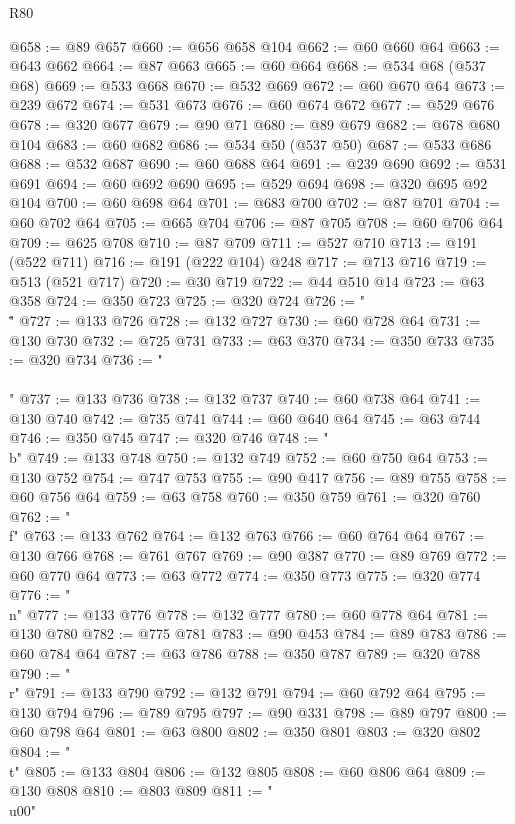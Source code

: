 \begin{lexlean}{R80}
\begin{coremodule}
@658 := @89 @657
@660 := @656 @658 @104
@662 := @60 @660 @64
@663 := @643 @662
@664 := @87 @663
@665 := @60 @664
@668 := @534 @68 (@537 @68)
@669 := @533 @668
@670 := @532 @669
@672 := @60 @670 @64
@673 := @239 @672
@674 := @531 @673
@676 := @60 @674 @672
@677 := @529 @676
@678 := @320 @677
@679 := @90 @71
@680 := @89 @679
@682 := @678 @680 @104
@683 := @60 @682
@686 := @534 @50 (@537 @50)
@687 := @533 @686
@688 := @532 @687
@690 := @60 @688 @64
@691 := @239 @690
@692 := @531 @691
@694 := @60 @692 @690
@695 := @529 @694
@698 := @320 @695 @92 @104
@700 := @60 @698 @64
@701 := @683 @700
@702 := @87 @701
@704 := @60 @702 @64
@705 := @665 @704
@706 := @87 @705
@708 := @60 @706 @64
@709 := @625 @708
@710 := @87 @709
@711 := @527 @710
@713 := @191 (@522 @711)
@716 := @191 (@222 @104) @248
@717 := @713 @716
@719 := @513 (@521 @717)
@720 := @30 @719
@722 := @44 @510 @14
@723 := @63 @358
@724 := @350 @723
@725 := @320 @724
@726 := "\\\""
@727 := @133 @726
@728 := @132 @727
@730 := @60 @728 @64
@731 := @130 @730
@732 := @725 @731
@733 := @63 @370
@734 := @350 @733
@735 := @320 @734
@736 := "\\\\"
@737 := @133 @736
@738 := @132 @737
@740 := @60 @738 @64
@741 := @130 @740
@742 := @735 @741
@744 := @60 @640 @64
@745 := @63 @744
@746 := @350 @745
@747 := @320 @746
@748 := "\\b"
@749 := @133 @748
@750 := @132 @749
@752 := @60 @750 @64
@753 := @130 @752
@754 := @747 @753
@755 := @90 @417
@756 := @89 @755
@758 := @60 @756 @64
@759 := @63 @758
@760 := @350 @759
@761 := @320 @760
@762 := "\\f"
@763 := @133 @762
@764 := @132 @763
@766 := @60 @764 @64
@767 := @130 @766
@768 := @761 @767
@769 := @90 @387
@770 := @89 @769
@772 := @60 @770 @64
@773 := @63 @772
@774 := @350 @773
@775 := @320 @774
@776 := "\\n"
@777 := @133 @776
@778 := @132 @777
@780 := @60 @778 @64
@781 := @130 @780
@782 := @775 @781
@783 := @90 @453
@784 := @89 @783
@786 := @60 @784 @64
@787 := @63 @786
@788 := @350 @787
@789 := @320 @788
@790 := "\\r"
@791 := @133 @790
@792 := @132 @791
@794 := @60 @792 @64
@795 := @130 @794
@796 := @789 @795
@797 := @90 @331
@798 := @89 @797
@800 := @60 @798 @64
@801 := @63 @800
@802 := @350 @801
@803 := @320 @802
@804 := "\\t"
@805 := @133 @804
@806 := @132 @805
@808 := @60 @806 @64
@809 := @130 @808
@810 := @803 @809
@811 := "\\u00"

\end{coremodule}
\end{lexlean}
